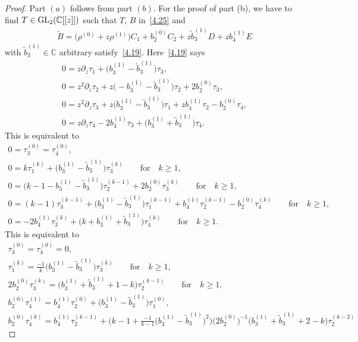 \documentclass[10pt,a4paper]{amsart}
\numberwithin{equation}{section}
\numberwithin{figure}{section}
\newcommand{\C}{{\mathbb C}}
\newcommand{\www}{\widetilde}
\newcommand{\paa}{\partial}
\begin{document}
\begin{proof}
Part $(a)$ follows from part $(b)$.
For the proof of part (b), we have to find
$T\in {\rm GL}_2(\C[[z]])$ such that $T$, $B$ in~\eqref{4.25}
and
\begin{gather*}
\www B=\big(\rho^{(0)}+z\rho^{(1)}\big)C_1+b_2^{(0)}C_2+z\www b_3^{(1)}D+zb_4^{(1)}E
\end{gather*}
with $\www b_3^{(1)}\in\C$ arbitrary satisfy~\eqref{4.19}.
Here~\eqref{4.19} says
\begin{gather*}%
0= z\paa_z\tau_1 + \big(b_3^{(1)}-\www b_3^{(1)}\big)\tau_3,
\\
0= z^2\paa_z\tau_2 + z\big({-}b_3^{(1)}-\www b_3^{(1)}\big)\tau_2+2b_2^{(0)}\tau_3,
\\
0= z^2\paa_z\tau_3 + z\big(b_3^{(1)}-\www b_3^{(1)}\big)\tau_1+ zb_4^{(1)}\tau_2-b_2^{(0)}\tau_4,
\\
0= z\paa_z\tau_4 -2b_4^{(1)}\tau_3+ \big(b_3^{(1)}+\www b_3^{(1)}\big)\tau_4.
\end{gather*}
This is equivalent to
\begin{gather*}%
0=\tau_3^{(0)}=\tau_4^{(0)},
\\
0= k\tau_1^{(k)} + \big(b_3^{(1)}-\www b_3^{(1)}\big)\tau_3^{(k)}\qquad
\text{for}\quad k\geq 1,
\\
0= \big(k-1-b_3^{(1)}-\www b_3^{(1)}\big)\tau_2^{(k-1)}+2b_2^{(0)}\tau_3^{(k)}\qquad
\text{for}\quad k\geq 1,
\\
0= (k-1)\tau_3^{(k-1)}+ \big(b_3^{(1)}-\www b_3^{(1)}\big)\tau_1^{(k-1)}
+ b_4^{(1)}\tau_2^{(k-1)}-b_2^{(0)}\tau_4^{(k)}\qquad
\text{for}\quad k\geq 1,
\\
0= -2b_4^{(1)}\tau_3^{(k)}+ \big(k+b_3^{(1)}+\www b_3^{(1)}\big)\tau_4^{(k)}\qquad
\text{for}\quad k\geq 1.
\end{gather*}
This is equivalent to
\begin{gather}
\tau_3^{(0)}=\tau_4^{(0)}=0,\nonumber
\\
\tau_1^{(k)}= \frac{-1}{k}\big(b_3^{(1)}-\www b_3^{(1)}\big)\tau_3^{(k)}\qquad
\text{for}\quad k\geq 1,\nonumber
\\
2b_2^{(0)}\tau_3^{(k)}= \big(b_3^{(1)}+\www b_3^{(1)}+1-k\big)\tau_2^{(k-1)}\qquad
\text{for}\quad k\geq 1,\nonumber
\\
b_2^{(0)}\tau_4^{(1)}=b_4^{(1)}\tau_2^{(0)}+\big(b_3^{(1)}-\www b_3^{(1)}\big)\tau_1^{(0)},\nonumber
\\
b_2^{(0)}\tau_4^{(k)}=b_4^{(1)}\tau_2^{(k-1)}
+\bigg(k-1+\frac{-1}{k-1}\big(b_3^{(1)}-\www b_3^{(1)}\big)^2\bigg)
\big(2b_2^{(0)}\big)^{-1}\big(b_3^{(1)}+\www b_3^{(1)}+2-k\big)\tau_2^{(k-2)}\nonumber

\end{gather}
\end{proof}
\end{document}
